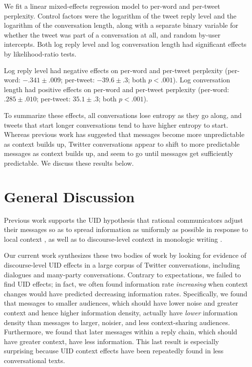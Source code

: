 \documentclass[11pt,letterpaper]{article}
\begin{document}
We fit a linear mixed-effects regression model to per-word and per-tweet perplexity.  Control factors were the logarithm of the tweet reply level and the logarithm of the conversation length, along with a separate binary variable for whether the tweet was part of a conversation at all, and random by-user intercepts.  Both log reply level and log conversation length had significant effects by likelihood-ratio tests.

Log reply level had negative effects on per-word and per-tweet perplexity (per-word: $-.341 \pm .009$; per-tweet: $-39.6 \pm .3$; both $p < .001$). Log conversation length had positive effects on per-word and per-tweet perplexity (per-word: $.285 \pm .010$; per-tweet: $35.1 \pm .3$; both $p < .001$).

To summarize these effects, all conversations lose entropy as they go along, and tweets that start longer conversations tend to have higher entropy to start.  Whereas previous work has suggested that messages become more unpredictable as context builds up, Twitter conversations appear to shift to more predictable messages as context builds up, and seem to go until messages get sufficiently predictable.  We discuss these results below.

\section{General Discussion}

Previous work supports the UID hypothesis that rational communicators adjust their messages so as to spread information as uniformly as possible in response to local context \cite{aylett2004,levy2007}, as well as to discourse-level context in monologic writing \cite{genzel2002,qian2012}. 

Our current work synthesizes these two bodies of work by looking for evidence of discourse-level UID effects in a large corpus of Twitter conversations, including dialogues and many-party conversations.  Contrary to expectations, we failed to find UID effects; in fact, we often found information rate \emph{increasing} when context changes would have predicted decreasing information rates.  Specifically, we found that messages to smaller audiences, which should have lower noise and greater context and hence higher information density, actually have \emph{lower} information density than messages to larger, noisier, and less context-sharing audiences. Furthermore, we found that later messages within a reply chain, which should have greater context, have less information.  This last result is especially surprising because UID context effects have been repeatedly found in less conversational texts.
\end{document}

